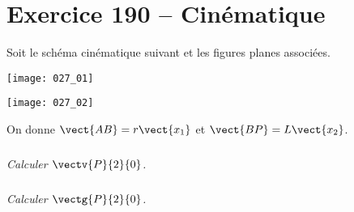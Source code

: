\section*{Exercice 190 -- Cinématique}
\setcounter{exo}{0}

Soit le schéma cinématique suivant et les figures planes associées.

\begin{center}
\texttt{[image: 027\_01]}
\end{center}

\begin{center}
\texttt{[image: 027\_02]}
\end{center}
On donne $\vect{AB}=r\vect{x_1}$ et $\vect{BP}=L\vect{x_2}$.

\subparagraph{}
\textit{Calculer $\vectv{P}{2}{0}$.}

\subparagraph{}
\textit{Calculer $\vectg{P}{2}{0}$.}


